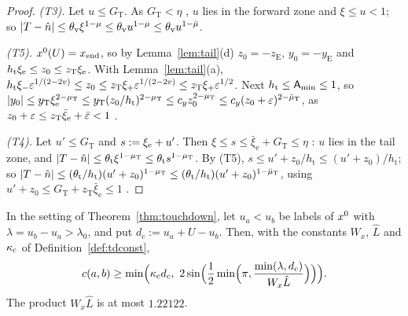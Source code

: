 \begin{proof}
\emph{\textup{(T3)}.} Let $u\le G_{\mathrm T}$. As $G_{\mathrm T}<\eta$ , $u$ lies in the forward zone and $\xi\le u<1$; so
$|T-\hat n|\le\theta_{\mathrm v}\xi^{1-\mu}\le\theta_{\mathrm v}u^{1-\mu}\le\theta_{\mathrm v}u^{1-\bar\mu}$.

\emph{\textup{(T5)}.} $x^0(U)=x_{\mathrm{end}}$, so by Lemma~\ref{lem:tail}(d) $z_0=-z_{\mathrm E}$, $y_0=-y_{\mathrm E}$ and
$h_{\mathrm t}\xi_{\mathrm e}\le z_0\le z_{\mathrm T}\xi_{\mathrm e}$. With Lemma~\ref{lem:tail}(a), $h_{\mathrm t}\xi_-\varepsilon^{1/(2-2v)}\le z_0\le
z_{\mathrm T}\xi_+\varepsilon^{1/(2-2v)}\le z_{\mathrm T}\xi_+\varepsilon^{1/2}$. Next $h_{\mathrm t}\le\mathsf A_{\min}\le1$, so
$|y_0|\le y_{\mathrm T}\xi_{\mathrm e}^{2-\mu_{\mathrm T}}\le y_{\mathrm T}(z_0/h_{\mathrm t})^{2-\mu_{\mathrm T}}\le c_yz_0^{2-\mu_{\mathrm T}}\le c_y(z_0+\varepsilon)^{2-\bar\mu_{\mathrm T}}$, as
$z_0+\varepsilon\le z_{\mathrm T}\bar\xi_{\mathrm e}+\bar\varepsilon<1$ .

\emph{\textup{(T4)}.} Let $u'\le G_{\mathrm T}$ and $s:=\xi_{\mathrm e}+u'$. Then $\xi\le s\le\bar\xi_{\mathrm e}+G_{\mathrm T}\le\eta$ : $u$
lies in the tail zone, and $|T-\hat n|\le\theta_{\mathrm t}\xi^{1-\mu_{\mathrm T}}\le\theta_{\mathrm t}s^{1-\mu_{\mathrm T}}$. By (T5), $s\le u'+z_0/h_{\mathrm t}\le
(u'+z_0)/h_{\mathrm t}$; so $|T-\hat n|\le(\theta_{\mathrm t}/h_{\mathrm t})(u'+z_0)^{1-\mu_{\mathrm T}}\le(\theta_{\mathrm t}/h_{\mathrm t})(u'+z_0)^{1-\bar\mu_{\mathrm T}}$,
using $u'+z_0\le G_{\mathrm T}+z_{\mathrm T}\bar\xi_{\mathrm e}\le1$ .
\end{proof}

\begin{lemma}\label{lem:T2star}
In the setting of Theorem~\ref{thm:touchdown}, let $u_a<u_b$ be labels of $x^0$ with $\lambda=u_b-u_a>\lambda_0$, and put
$d_c:=u_a+U-u_b$. Then, with the constants $W_x$, $\hat L$ and $\kappa_{\mathrm c}$ of Definition~\ref{def:tdconst},
\[
c(a,b)\ge\min\Bigl(\kc d_c,\ 2\sin\Bigl(\frac12\min\Bigl(\pi,\frac{\min(\lambda,d_c)}{W_x\hat L}\Bigr)\Bigr)\Bigr).
\]
The product $W_x\hat L$ is at most $1.22122$.
\end{lemma}


